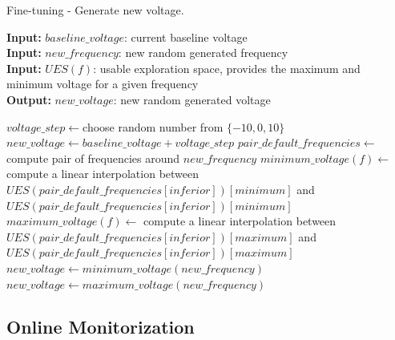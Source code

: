 \begin{algorithm}
\caption{Fine-tuning - Generate new voltage.}
    \label{alg:fine-voltage} 
    \hspace*{\algorithmicindent} \textbf{Input:} $baseline\_voltage$: current baseline voltage \\
 \hspace*{\algorithmicindent} \textbf{Input:} $new\_frequency$: new random generated frequency \\
 \hspace*{\algorithmicindent} \textbf{Input:} $UES(f)$: usable exploration space, provides the maximum and minimum voltage for a given frequency \\
 \hspace*{\algorithmicindent} \textbf{Output:} $new\_voltage$: new random generated voltage
\begin{algorithmic}
\STATE $voltage\_step \leftarrow $choose random number from $\{-10,0, 10\}$
\STATE $new\_voltage \leftarrow baseline\_voltage + voltage\_step$
\STATE $pair\_default\_frequencies \leftarrow $ compute pair of frequencies around $new\_frequency$
\STATE $minimum\_voltage(f) \leftarrow$ compute a linear interpolation between\\ 
\hspace*{\algorithmicindent}$UES(pair\_default\_frequencies[inferior])[minimum]$ and\\
\hspace*{\algorithmicindent}$UES(pair\_default\_frequencies[inferior])[minimum]$
\STATE $maximum\_voltage(f) \leftarrow$ compute a linear interpolation between\\
\hspace*{\algorithmicindent}$UES(pair\_default\_frequencies[inferior])[maximum]$ and\\
\hspace*{\algorithmicindent}$UES(pair\_default\_frequencies[inferior])[maximum]$
\STATE $new\_voltage \leftarrow minimum\_voltage(new\_frequency)$
\STATE $new\_voltage \leftarrow maximum\_voltage(new\_frequency)$
\ENDIF
\end{algorithmic}
\end{algorithm}



\subsection{Online Monitorization}

